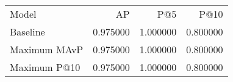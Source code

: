 \begin{tabular}{lrrr}
Model & AP & P@5 & P@10 \\
Baseline & 0.975000 & 1.000000 & 0.800000 \\
Maximum MAvP & 0.975000 & 1.000000 & 0.800000 \\
Maximum P@10 & 0.975000 & 1.000000 & 0.800000 \\
\end{tabular}

